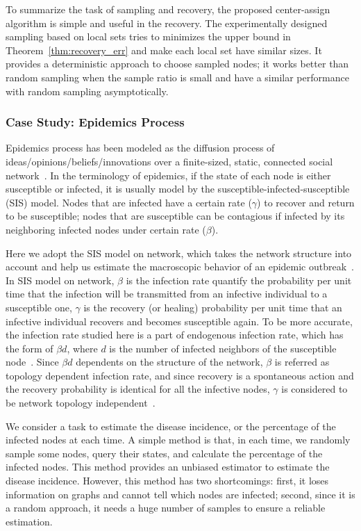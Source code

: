\documentclass[journal,twocolumn,10pt]{IEEEtran}
\theoremstyle{definition}
\begin{document}
To summarize the task of sampling and recovery, the proposed center-assign algorithm is simple and useful in the recovery. The experimentally designed sampling based on local sets tries to minimizes the upper bound in Theorem~\ref{thm:recovery_err} and make each local set have similar sizes. It provides a deterministic approach to choose sampled nodes; it works better than random sampling when the sample ratio is small and have a similar performance with random sampling asymptotically.




\subsubsection{Case Study: Epidemics Process}
Epidemics process has been modeled as the diffusion process of ideas/opinions/beliefs/innovations over a finite-sized, static,
connected social network~\cite{ZhangM:14}. In the terminology of epidemics, if the state of each node is either susceptible or infected, it is usually model by the susceptible-infected-susceptible (SIS) model. Nodes that are infected have a certain rate ($\gamma$) to recover and return to be susceptible; nodes that are susceptible can be contagious if infected by its neighboring infected nodes under certain rate ($\beta$).

Here we adopt the SIS model on network, which takes the network structure into account and help us estimate the macroscopic behavior of an epidemic outbreak~\cite{Newman:10}. In SIS model on network, $\beta$ is the infection rate quantify the probability per unit time that the infection will be transmitted from an infective individual to a susceptible one, $\gamma$ is the recovery (or healing) probability per unit time that an infective individual recovers and becomes susceptible again. To be more accurate, the infection rate studied here is a part of endogenous infection rate, which has the form of $\beta d$, where $d$ is the number of infected neighbors of the susceptible node~\cite{ZhangM:14, ZhangM:12}.  Since $\beta d$ dependents on the structure of the network, $\beta$ is referred as topology dependent infection rate, and since recovery is a spontaneous action and the recovery probability is identical for all the infective nodes, $\gamma$ is considered to be network topology independent~\cite{ZhangM:14}.

We consider a task to estimate the disease incidence, or the percentage of the infected nodes at each time. A simple method is that, in each time, we randomly sample some nodes, query their states, and calculate the percentage of the infected nodes. This method provides an unbiased estimator to estimate the disease incidence. However, this method has two shortcomings: first, it loses information on graphs and cannot tell which nodes are infected; second, since it is a random approach, it needs a huge number of samples to ensure a reliable estimation. 
\end{document}
